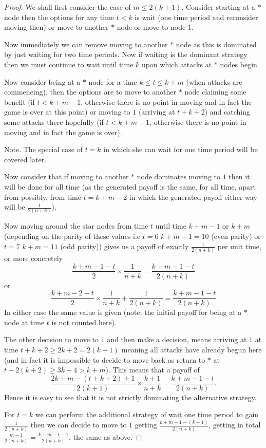 \documentclass[a4paper,10pt]{article}
\theoremstyle{definition}
\theoremstyle{definition}
\theoremstyle{remark}
\theoremstyle{definition}
\begin{document}
\begin{proof}
We shall first consider the case of $m \leq 2(k+1)$. Consider starting at a $*$ node then the options for any time $t<k$ is wait (one time period and reconsider moving then) or move to another $*$ node or move to node $1$.

Now immediately we can remove moving to another $*$ node as this is dominated by just waiting for two time periods. Now if waiting is the dominant strategy then we must continue to wait until time $k$ upon which attacks at $*$ nodes begin.

Now consider being at a $*$ node for a time $k \leq t \leq k+m$ (when attacks are commencing), then the options are to move to another $*$ node claiming some benefit (if $t<k+m-1$, otherwise there is no point in moving and in fact the game is over at this point) or moving to $1$ (arriving at $t+k+2$) and catching some attacks there hopefully (if $t < k+m-1$, otherwise there is no point in moving and in fact the game is over).

Note. The special case of $t=k$ in which she can wait for one time period will be covered later.

Now consider that if moving to another $*$ node dominates moving to $1$ then it will be done for all time (as the generated payoff is the same, for all time, apart from possibly, from time $t=k+m-2$ in which the generated payoff either way will be $\frac{1}{2(n+k)}$).

Now moving around the star nodes from time $t$ until time $k+m-1$ or $k+m$ (depending on the parity of these values i.e $t=6$ $k+m-1=10$ (even parity) or $t=7$ $k+m=11$ (odd parity)) gives us a payoff of exactly $\frac{1}{2(n+k)}$ per unit time, or more concretely
$$\frac{k+m-1-t}{2} \times \frac{1}{n+k}=\frac{k+m-1-t}{2(n+k)} $$
or
$$\frac{k+m-2-t}{2} \times \frac{1}{n+k}+\frac{1}{2(n+k)}=\frac{k+m-1-t}{2(n+k)}$$
In either case the same value is given (note. the initial payoff for being at a $*$ node at time $t$ is not counted here).

The other decision to move to $1$ and then make a decision, means arriving at $1$ at time $t+k+2 \geq 2k+2=2(k+1)$ meaning all attacks have already begun here (and in fact it is impossible to decide to move back as return to $*$ at $t+2(k+2) \geq 3k+4 > k+m$). This means that a payoff of
$$\frac{2k+m-(t+k+2)+1}{2(k+1)} \times \frac{k+1}{n+k}=\frac{k+m-1-t}{2(n+k)}.$$
Hence it is easy to see that it is not strictly dominating the alternative strategy.

For $t=k$ we can perform the additional strategy of wait one time period to gain $\frac{1}{2(n+k)}$ then we can decide to move to $1$ getting $\frac{k+m-1-(k+1)}{2(n+k)}$, getting in total $\frac{m-1}{2(n+k)}=\frac{k+m-t-1}{2(n+k)}$, the same as above.


\end{proof}
\end{document}
